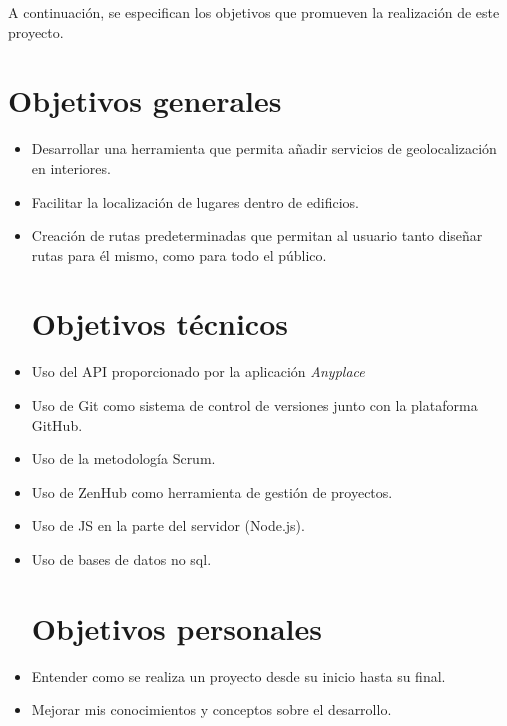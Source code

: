 
A continuación, se especifican los objetivos que promueven la realización
de este proyecto.
\section{Objetivos generales}\label{objetivos-generales}
\begin{itemize}
\item
Desarrollar una herramienta que permita añadir servicios de geolocalización
en interiores.
\item
Facilitar la localización de lugares dentro de edificios.
\item
Creación de rutas predeterminadas que permitan al usuario tanto diseñar rutas para él mismo,
como para todo el público.
\section{Objetivos técnicos}\label{objetivos-tecnicos}
\item
Uso del API proporcionado por la aplicación \textit{Anyplace}
\item
Uso de Git como sistema de control de versiones junto con la plataforma GitHub. 
\item
Uso de la metodología Scrum.
\item 
Uso de ZenHub como herramienta de gestión de proyectos.
\item
Uso de JS en la parte del servidor (Node.js).
\item
Uso de bases de datos no sql.

\section{Objetivos personales}\label{objetivos-personales}
\item
Entender como se realiza un proyecto desde su inicio hasta su final.
\item
Mejorar mis conocimientos y conceptos sobre el desarrollo.
\end{itemize}
